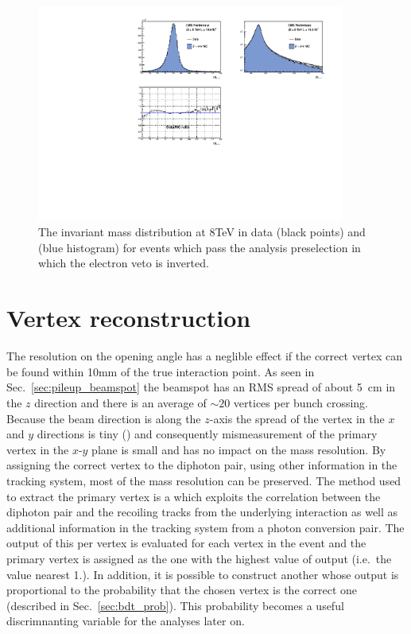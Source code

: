 \begin{figure}
  \includegraphics[width=0.9\textwidth]{ch3_comm_anal_comps/plots/smearing_mass_Zee_8TeV.pdf}
  \caption{The \Zee invariant mass distribution at 8TeV in data (black points) and \MC (blue histogram) for events which pass the analysis preselection in which the electron veto is inverted.}
  \label{fig:scale_smearing_analysis_8TeV}
\end{figure}

\section{Vertex reconstruction}
\label{sec:vtx_reco}

The resolution on the opening angle has a neglible effect if the correct vertex can be found within 10mm of the true interaction point. As seen in Sec.~\ref{sec:pileup_beamspot} the beamspot has an RMS spread of about 5~cm in the $z$ direction and there is an average of $\sim20$ vertices per bunch crossing. Because the beam direction is along the $z$-axis the spread of the vertex in the $x$ and $y$ directions is tiny () and consequently mismeasurement of the primary vertex in the $x$-$y$ plane is small and has no impact on the mass resolution. By assigning the correct vertex to the diphoton pair, using other information in the tracking system, most of the mass resolution can be preserved. The method used to extract the primary vertex is a \BDT which exploits the correlation between the diphoton pair and the recoiling tracks from the underlying interaction as well as additional information in the tracking system from a photon conversion pair. The output of this per vertex \BDT is evaluated for each vertex in the event and the primary vertex is assigned as the one with the highest value of \BDT output (i.e.\ the value nearest 1.). In addition, it is possible to construct another \BDT whose output is proportional to the probability that the chosen vertex is the correct one (described in Sec.~\ref{sec:bdt_prob}). This probability becomes a useful discrimnanting variable for the analyses later on.

